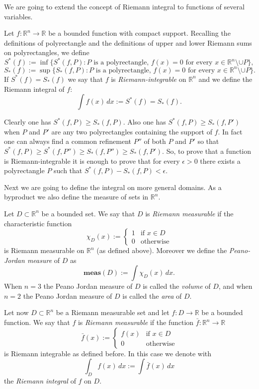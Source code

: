 \documentclass[12pt]{article}
\newcommand{\R}{\mathbb R}
\theoremstyle{remark}
\begin{document}
We are going to extend the concept of Riemann integral to functions of several variables.

Let $f\colon\mathbb R^n \to\mathbb R$ be a bounded function with compact support. 
Recalling the definitions of polyrectangle and the definitions of upper and lower Riemann sums on polyrectangles,
we define
\[
  S^*(f) := \inf\{ S^*(f,P) \colon \text{$P$ is a polyrectangle, $f(x)=0$ for every $x\in\mathbb R^n\setminus \cup P$}\},
\]
\[
  S_*(f) := \sup\{ S_*(f,P) \colon \text{$P$ is a polyrectangle, $f(x)=0$ for every $x\in\mathbb R^n\setminus \cup P$}\}.
\]
If $S^*(f)=S_*(f)$ we say that $f$ is \emph{Riemann-integrable} on $\mathbb R^n$ and we define the Riemann integral of $f$:
\[
  \int f(x)\, dx := S^*(f) = S_*(f).
\]

Clearly one has $S^*(f,P)\ge S_*(f,P)$. Also one has $S^*(f,P)\ge S_*(f,P')$ when $P$ and $P'$ are any two polyrectangles containing the support of $f$. In fact one can always find a common refinement $P''$ of both $P$ and $P'$ so that $S^*(f,P)\ge S^*(f,P'')\ge S_*(f,P'')\ge S_*(f,P')$. So, to prove that a function is Riemann-integrable it is enough to prove that for every $\epsilon>0$ there exists a polyrectangle $P$ such that $S^*(f,P)-S_*(f,P)<\epsilon$.

Next we are going to define the integral on more general domains. As a byproduct we also define the measure of sets in $\mathbb R^n$.

Let $D\subset \mathbb R^n$ be a bounded set. We say that $D$ is \emph{Riemann measurable} if
the characteristic function 
\[
\chi_D(x):=\begin{cases} 1 &\text{if $x\in D$}\\
0 &\text{otherwise}\end{cases}
\]
is Riemann measurable on $\R^n$ (as defined above). Moreover we define the \emph{Peano-Jordan measure} of $D$ as
\[
  \mathbf{meas}(D) := \int \chi_D(x)\, dx.
\]
When $n=3$ the Peano Jordan measure of $D$ is called the \emph{volume} of $D$, 
and when $n=2$ the Peano Jordan measure of $D$ is called the \emph{area} of $D$.

Let now $D\subset \mathbb R^n$ be a Riemann measurable set and let $f\colon D\to \mathbb R$ be a bounded function. We say that $f$ is \emph{Riemann measurable} if the function $\bar f\colon\mathbb R^n\to\mathbb R$
\[
  \bar f(x) :=\begin{cases} f(x)&\text{if $x\in D$}\\
0&\text{otherwise}
\end{cases}
\]
is Riemann integrable as defined before. In this case we denote with
\[
   \int_D f(x)\, dx := \int \bar f(x)\, dx
\]
the \emph{Riemann integral} of $f$ on $D$.
\end{document}
